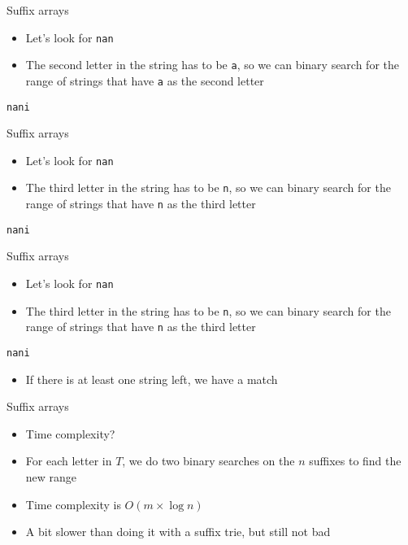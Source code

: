 \documentclass[12pt,t]{beamer}
\newcommand{\bi}{\begin{itemize}}
\newcommand{\ei}{\end{itemize}}
\begin{document}
\begin{frame}[fragile]{Suffix arrays}
    \vspace{10pt}
    \bi
\item Let's look for \texttt{nan}
\item The second letter in the string has to be \texttt{a}, so we can binary search for the range of strings that have \texttt{a} as the second letter
    \ei
    \vspace{10pt}
    \begin{verbatim}
nani
    \end{verbatim}
\end{frame}

\begin{frame}[fragile]{Suffix arrays}
    \vspace{10pt}
    \bi
\item Let's look for \texttt{nan}
\item The third letter in the string has to be \texttt{n}, so we can binary search for the range of strings that have \texttt{n} as the third letter
    \ei
    \vspace{10pt}
    \begin{verbatim}
nani
    \end{verbatim}
\end{frame}

\begin{frame}[fragile]{Suffix arrays}
    \vspace{10pt}
    \bi
\item Let's look for \texttt{nan}
\item The third letter in the string has to be \texttt{n}, so we can binary search for the range of strings that have \texttt{n} as the third letter
    \ei
    \vspace{10pt}
    \begin{verbatim}
nani
    \end{verbatim}
    \bi
\item<2-> If there is at least one string left, we have a match
    \ei
\end{frame}

\begin{frame}{Suffix arrays}
    \vspace{30pt}
    \bi
        \item Time complexity?
            \vspace{5pt}
        \item For each letter in $T$, we do two binary searches on the $n$ suffixes to find the new range
        \item Time complexity is $O(m \times \log n)$
            \vspace{10pt}
        \item A bit slower than doing it with a suffix trie, but still not bad
    \ei
\end{frame}
\end{document}
